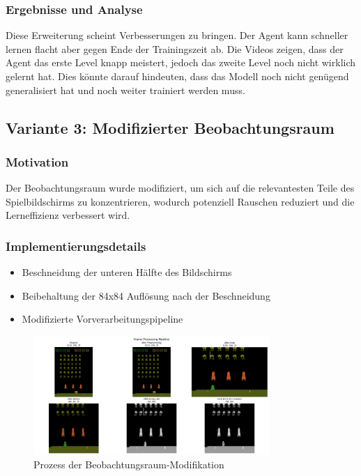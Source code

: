 \documentclass{article}
\begin{document}
\subsubsection{Ergebnisse und Analyse}
Diese Erweiterung scheint Verbesserungen zu bringen. Der Agent kann schneller lernen flacht aber gegen Ende der Trainingszeit ab. Die Videos zeigen, dass der Agent das erste Level knapp meistert, jedoch das zweite Level noch nicht wirklich gelernt hat. Dies könnte darauf hindeuten, dass das Modell noch nicht genügend generalisiert hat und noch weiter trainiert werden muss.
\newpage
\subsection{Variante 3: Modifizierter Beobachtungsraum}
\subsubsection{Motivation}
Der Beobachtungsraum wurde modifiziert, um sich auf die relevantesten Teile des Spielbildschirms zu konzentrieren, wodurch potenziell Rauschen reduziert und die Lerneffizienz verbessert wird.

\subsubsection{Implementierungsdetails}
\begin{itemize}
    \item Beschneidung der unteren Hälfte des Bildschirms
    \item Beibehaltung der 84x84 Auflösung nach der Beschneidung
    \item Modifizierte Vorverarbeitungspipeline
\end{itemize}

\begin{figure}[H]
    \centering
    \includegraphics[width=0.8\textwidth]{./Figure_1.png}
    \caption{Prozess der Beobachtungsraum-Modifikation}
\end{figure}
\end{document}
